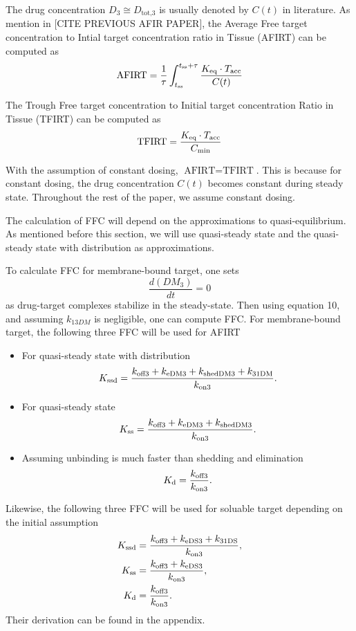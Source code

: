 The drug concentration $D_3 \cong D_{\text{tot,3}}$ is usually denoted
by $C(t)$ in literature. As mention in [CITE PREVIOUS AFIR PAPER],
the Average Free target concentration to Intial target concentration 
ratio in Tissue (AFIRT) can be computed as
\[
    \text{AFIRT} = 
    \frac{1}{\tau}\int_{t_{\text{ss}}}^{t_{\text{ss}} + \tau}
    \frac{K_\text{eq}\cdot T_{\text{acc}}}{C(t)}
\]

The Trough Free target concentration to Initial target concentration
Ratio in Tissue (TFIRT) can be computed as
\[
    \text{TFIRT} = 
    \frac{K_\text{eq}\cdot T_{\text{acc}}}{C_{\min}}
\]

With the assumption of constant dosing, $\text{AFIRT} = \text{TFIRT}$.
This is because for constant dosing, the drug concentration $C(t)$ becomes
constant during steady state. Throughout the rest of the paper, 
we assume constant dosing.




The calculation of FFC will depend on the approximations to 
quasi-equilibrium. As mentioned before this section, we will use
quasi-steady state and the quasi-steady state with distribution as
approximations.

To calculate FFC for membrane-bound target, one sets 
\[
    \frac{d(DM_3)}{dt} = 0
\]
as drug-target complexes stabilize in the steady-state.
Then using equation 10, and assuming $k_{13DM}$ is negligible, one can
compute FFC.
For membrane-bound target, the following three FFC will be used for AFIRT
\begin{itemize}
    \item For quasi-steady state with distribution
    \[
        K_\text{ssd}  = \frac{k_{\text{off3}} + k_{\text{eDM3}} + k_{\text{shedDM3}} +k_{\text{31DM}}}{k_{\text{on3}}}.
    \]
    \item For quasi-steady state
    \[
        K_\text{ss}   = \frac{k_{\text{off3}} + k_{\text{eDM3}} + k_{\text{shedDM3}}}{k_{\text{on3}}}.
    \]
    \item Assuming unbinding is much faster than shedding and elimination
    \[
        K_\text{d}    = \frac{k_{\text{off3}}}{k_{\text{on3}}}.
    \]
\end{itemize}

Likewise, the following three FFC will be used for soluable target
depending on the initial assumption
\begin{align*}
    K_\text{ssd} & = \frac{k_{\text{off3}} + k_{\text{eDS3}} + k_{\text{31DS}}}{k_{\text{on3}}}, \\
    K_\text{ss}  & = \frac{k_{\text{off3}} + k_{\text{eDS3}}}{k_{\text{on3}}}, \\
    K_\text{d}   & = \frac{k_{\text{off3}}}{k_{\text{on3}}}.
\end{align*}
Their derivation can be found in the appendix.

